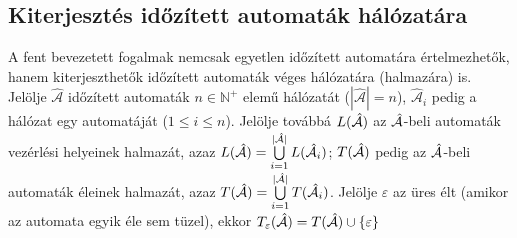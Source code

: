 \subsection{Kiterjesztés időzített automaták hálózatára}

A fent bevezetett fogalmak nemcsak egyetlen időzített automatára értelmezhetők, hanem kiterjeszthetők időzített automaták véges hálózatára (halmazára) is. Jelölje $\hat{\mathcal{A}}$ időzített automaták $n \in \mathbb{N}^+$ elemű hálózatát ($|\hat{\mathcal{A}}| = n$), $\hat{\mathcal{A}}_i$ pedig a hálózat egy automatáját ($1 \leq i \leq n$). Jelölje továbbá $L(\hat{\mathcal{A}})$ az $\hat{\mathcal{A}}$-beli automaták vezérlési helyeinek halmazát, azaz $L(\hat{\mathcal{A}}) = \bigcup\limits_{i = 1}^{|\hat{\mathcal{A}}|} L(\hat{\mathcal{A}}_i)$; $T(\hat{\mathcal{A}})$ pedig az $\hat{\mathcal{A}}$-beli automaták éleinek halmazát, azaz $T(\hat{\mathcal{A}}) = \bigcup\limits_{i = 1}^{|\hat{\mathcal{A}}|} T(\hat{\mathcal{A}}_i)$. Jelölje $\varepsilon$ az üres élt (amikor az automata egyik éle sem tüzel), ekkor $T_\varepsilon(\hat{\mathcal{A}}) = T(\hat{\mathcal{A}}) \cup \{ \varepsilon \}$

